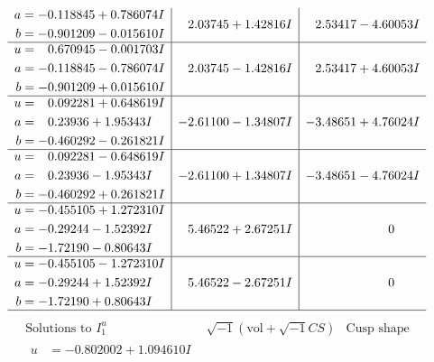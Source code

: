 \documentclass[1p]{elsarticle_modified}
\theoremstyle{definition}
\newcommand{\I}{\sqrt{-1}}
\begin{document}
$$\begin{array}{c|c|c}
\begin{aligned}
a &= -0.118845 + 0.786074 I \\
b &= -0.901209 - 0.015610 I\end{aligned}
 & \phantom{-}2.03745 + 1.42816 I & \phantom{-}2.53417 - 4.60053 I \\ \hline\begin{aligned}
u &= \phantom{-}0.670945 - 0.001703 I \\
a &= -0.118845 - 0.786074 I \\
b &= -0.901209 + 0.015610 I\end{aligned}
 & \phantom{-}2.03745 - 1.42816 I & \phantom{-}2.53417 + 4.60053 I \\ \hline\begin{aligned}
u &= \phantom{-}0.092281 + 0.648619 I \\
a &= \phantom{-}0.23936 + 1.95343 I \\
b &= -0.460292 - 0.261821 I\end{aligned}
 & -2.61100 - 1.34807 I & -3.48651 + 4.76024 I \\ \hline\begin{aligned}
u &= \phantom{-}0.092281 - 0.648619 I \\
a &= \phantom{-}0.23936 - 1.95343 I \\
b &= -0.460292 + 0.261821 I\end{aligned}
 & -2.61100 + 1.34807 I & -3.48651 - 4.76024 I \\ \hline\begin{aligned}
u &= -0.455105 + 1.272310 I \\
a &= -0.29244 - 1.52392 I \\
b &= -1.72190 - 0.80643 I\end{aligned}
 & \phantom{-}5.46522 + 2.67251 I & \phantom{-0.000000 } 0 \\ \hline\begin{aligned}
u &= -0.455105 - 1.272310 I \\
a &= -0.29244 + 1.52392 I \\
b &= -1.72190 + 0.80643 I\end{aligned}
 & \phantom{-}5.46522 - 2.67251 I & \phantom{-0.000000 } 0\\
 \hline 
 \end{array}$$\newpage$$\begin{array}{c|c|c}  
\text{Solutions to }I^u_{1}& \I (\text{vol} + \sqrt{-1}CS) & \text{Cusp shape}\\
 \hline 
\begin{aligned}
u &= -0.802002 + 1.094610 I \\

\end{aligned}
\end{array}$$
\end{document}
